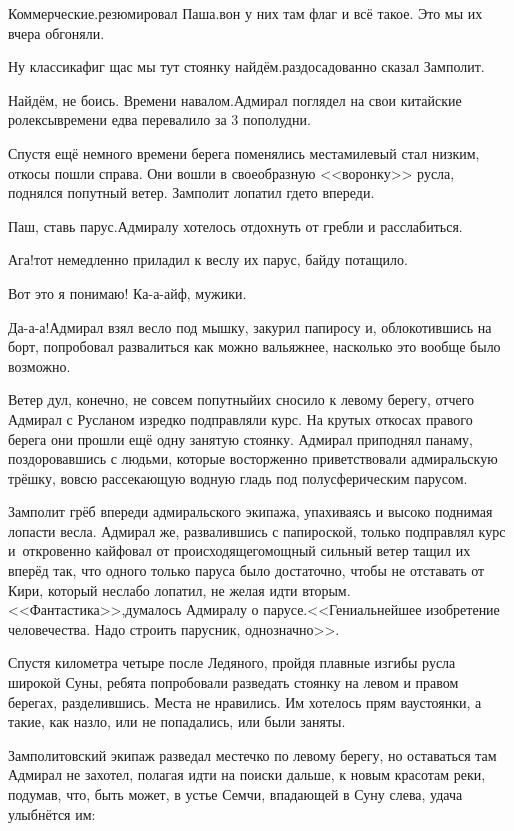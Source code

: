 \diagdash Коммерческие.\mdash резюмировал Паша.\mdash вон у них там флаг и всё такое. Это мы их вчера обгоняли.

\diagdash Ну классика\mdash фиг щас мы тут стоянку найдём.\mdash раздосадованно сказал Замполит.

\diagdash Найдём, не боись. Времени навалом.\mdash Адмирал поглядел на свои китайские ролексы\mdash времени едва перевалило за 3 пополудни.

Спустя ещё немного времени берега поменялись местами\mdash левый стал низким, откосы пошли справа. Они вошли в своеобразную <<воронку>> русла, поднялся попутный ветер. Замполит лопатил где\sdash то впереди.

\diagdash Паш, ставь парус.\mdash Адмиралу хотелось отдохнуть от гребли и расслабиться.

\diagdash Ага!\mdash тот немедленно приладил к веслу их парус, байду потащило.

\diagdash Вот это я понимаю! Ка-а-айф, мужики.

\diagdash Да-а-а!\mdash Адмирал взял весло под мышку, закурил папиросу и, облокотившись на борт, попробовал развалиться как можно вальяжнее, насколько это вообще было возможно. 

Ветер дул, конечно, не совсем попутный\mdash их сносило к левому берегу, отчего Адмирал с Русланом изредко подправляли курс. На крутых откосах правого берега они прошли ещё одну занятую стоянку. Адмирал приподнял панаму, поздоровавшись с людьми, которые восторженно приветствовали адмиральскую трёшку, вовсю рассекающую водную гладь под полусферическим парусом.

Замполит грёб впереди адмиральского экипажа, упахиваясь и высоко поднимая лопасти весла. Адмирал же, развалившись с папироской, только подправлял курс и~откровенно кайфовал от происходящего\mdash мощный сильный ветер тащил их вперёд так, что одного только паруса было достаточно, чтобы не отставать от Кири, который неслабо лопатил, не желая идти вторым. <<Фантастика>>,\mdash думалось Адмиралу о парусе.\mdash<<Гениальнейшее изобретение человечества. Надо строить парусник, однозначно>>.

Спустя километра четыре после Ледяного, пройдя плавные изгибы русла широкой Суны, ребята попробовали разведать стоянку на левом и правом берегах, разделившись. Места не нравились. Им хотелось прям вау\sdash стоянки, а такие, как назло, или не попадались, или были заняты.

Замполитовский экипаж разведал местечко по левому берегу, но оставаться там Адмирал не захотел, полагая идти на поиски дальше, к новым красотам реки, подумав, что, быть может, в устье Семчи, впадающей в Суну слева, удача улыбнётся им:

